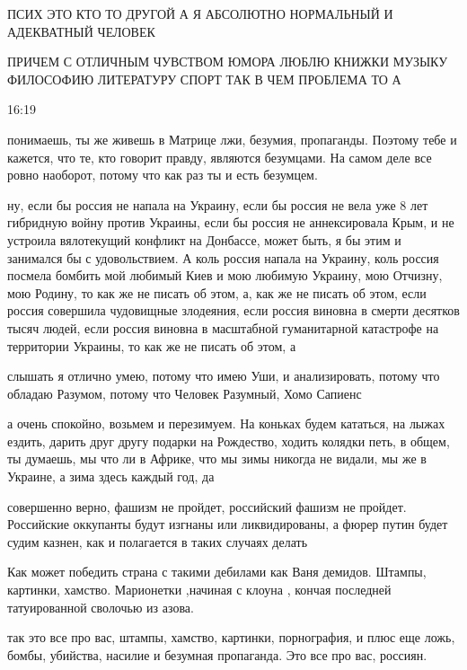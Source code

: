 ПСИХ ЭТО КТО ТО ДРУГОЙ А Я АБСОЛЮТНО НОРМАЛЬНЫЙ И АДЕКВАТНЫЙ ЧЕЛОВЕК

ПРИЧЕМ С ОТЛИЧНЫМ ЧУВСТВОМ ЮМОРА ЛЮБЛЮ КНИЖКИ МУЗЫКУ ФИЛОСОФИЮ ЛИТЕРАТУРУ СПОРТ
ТАК В ЧЕМ ПРОБЛЕМА ТО А

16:19

понимаешь, ты же живешь в Матрице лжи, безумия, пропаганды. Поэтому тебе и
кажется, что те, кто говорит правду, являются безумцами. На самом деле все
ровно наоборот, потому что как раз ты и есть безумцем.





ну, если бы россия не напала на Украину, если бы россия не вела уже 8 лет
гибридную войну против Украины, если бы россия не аннексировала Крым, и не
устроила вялотекущий конфликт на Донбассе, может быть, я бы этим и занимался бы
с удовольствием. А коль россия напала на Украину, коль россия посмела бомбить
мой любимый Киев и мою любимую Украину, мою Отчизну, мою Родину, то как же не
писать об этом, а, как же не писать об этом, если россия совершила чудовищные
злодеяния, если россия виновна в смерти десятков тысяч людей, если россия
виновна в масштабной гуманитарной катастрофе на территории Украины, то как же
не писать об этом, а

слышать я отлично умею, потому что имею Уши, и анализировать, потому что
обладаю Разумом, потому что Человек Разумный, Хомо Сапиенс

а очень спокойно, возьмем и перезимуем. На коньках будем кататься, на лыжах
ездить, дарить друг другу подарки на Рождество, ходить колядки петь, в общем,
ты думаешь, мы что ли в Африке, что мы зимы никогда не видали, мы же в Украине,
а зима здесь каждый год, да

совершенно верно, фашизм не пройдет, российский фашизм не пройдет. Российские
оккупанты будут изгнаны или ликвидированы, а фюрер путин будет судим казнен,
как и полагается в таких случаях делать


Как может победить страна с такими дебилами как Ваня демидов. Штампы, картинки,
хамство. Марионетки ,начиная с клоуна , кончая последней татуированной сволочью
из азова.

так это все про вас, штампы, хамство, картинки, порнография, и плюс еще ложь,
бомбы, убийства, насилие и безумная пропаганда. Это все про вас, россиян.

